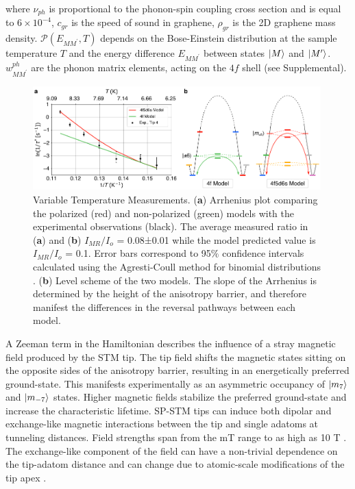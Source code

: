 \documentclass[
reprint,amsmath,amssymb,aps]{revtex4-2}
\begin{document}
where $\nu_{ph}$ is proportional to the phonon-spin coupling cross section and is equal to $6 \times 10^{-4}$, $c_{gr}$ is the speed of sound in graphene, $\rho_{gr}$ is the 2D graphene mass density. $\mathcal{P}\left( E_{MM^{\prime}}, T \right)$ depends on the Bose-Einstein distribution at the sample temperature $T$ and the energy difference $E_{MM^{\prime}}$ between states $\ket{M}$ and $\ket{M^{\prime}}$. $w^{ph}_{MM^{\prime}}$ are the phonon matrix elements, acting on the $4f$ shell (see Supplemental).

\begin{figure}[t!]
\includegraphics[width=0.99\textwidth]{Fig3_new.pdf}
\caption{Variable Temperature Measurements. (\textbf{a}) Arrhenius plot comparing the polarized (red) and non-polarized (green) models with the experimental observations (black). The average measured ratio in (\textbf{a}) and (\textbf{b}) $I_{MR}/I_{o}$ = 0.08±0.01 while the model predicted value is $I_{MR}/I_{o}$ = 0.1. Error bars correspond to 95$\%$ confidence intervals calculated using the Agresti-Coull method for binomial distributions \citep{agresti1998}. (\textbf{b}) Level scheme of the two models. The slope of the Arrhenius is determined by the height of the anisotropy barrier, and therefore manifest the differences in the reversal pathways between each model. 
\label{fig:temp} }
\end{figure}

A Zeeman term in the Hamiltonian describes the influence of a stray magnetic field produced by the STM tip. The tip field shifts the magnetic states sitting on the opposite sides of the anisotropy barrier, resulting in an energetically preferred ground-state. This manifests experimentally as an asymmetric occupancy of $\ket{m_7}$ and $\ket{m_{-7}}$ states. Higher magnetic fields stabilize the preferred ground-state and increase the characteristic lifetime. SP-STM tips can induce both dipolar and exchange-like magnetic interactions between the tip and single adatoms at tunneling distances. Field strengths span from the mT range to as high as 10 T \cite{yang2019}. The exchange-like component of the field can have a non-trivial dependence on the tip-adatom distance and can change due to atomic-scale modifications of the tip apex \cite{hauptmannQuantifyingExchangeForces2020,tao_SwitchingSingleSpin_2009,lazoFirstprinciplesStudyMagnetic2011,lazoRoleTipSize2008}.  
\end{document}
